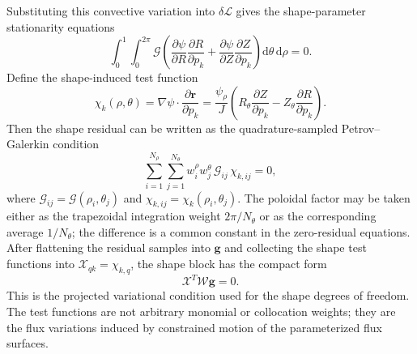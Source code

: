 \documentclass[final, 3p, times]{elsarticle}
\begin{document}
Substituting this convective variation into $\delta\mathcal{L}$ gives the shape-parameter stationarity equations
\begin{equation}
    \int_0^1\!\int_0^{2\pi}
    \mathcal{G}\left(
    \frac{\partial\psi}{\partial R}\frac{\partial R}{\partial p_k}
    +
    \frac{\partial\psi}{\partial Z}\frac{\partial Z}{\partial p_k}
    \right)
    \mathrm{d}\theta\,\mathrm{d}\rho=0.
\end{equation}
Define the shape-induced test function
\begin{equation*}
    \chi_k(\rho,\theta)
    =\nabla\psi\cdot\frac{\partial\mathbf{r}}{\partial p_k}
    =\frac{\psi_\rho}{J}
    \left(R_\theta\frac{\partial Z}{\partial p_k}
    -Z_\theta\frac{\partial R}{\partial p_k}\right).
\end{equation*}
Then the shape residual can be written as the quadrature-sampled Petrov--Galerkin condition
\begin{equation}
    \sum_{i=1}^{N_\rho}\sum_{j=1}^{N_\theta}
    w_i^\rho w_j^\theta\,
    \mathcal{G}_{ij}\,\chi_{k,ij}=0,
\end{equation}
where $\mathcal{G}_{ij}=\mathcal{G}(\rho_i,\theta_j)$ and $\chi_{k,ij}=\chi_k(\rho_i,\theta_j)$. The poloidal factor may be taken either as the trapezoidal integration weight $2\pi/N_\theta$ or as the corresponding average $1/N_\theta$; the difference is a common constant in the zero-residual equations. After flattening the residual samples into $\mathbf{g}$ and collecting the shape test functions into $\mathcal{X}_{qk}=\chi_{k,q}$, the shape block has the compact form
\begin{equation}
    \mathcal{X}^{T}\mathcal{W}\mathbf{g}=0.
\end{equation}
This is the projected variational condition used for the shape degrees of freedom. The test functions are not arbitrary monomial or collocation weights; they are the flux variations induced by constrained motion of the parameterized flux surfaces.
\end{document}
